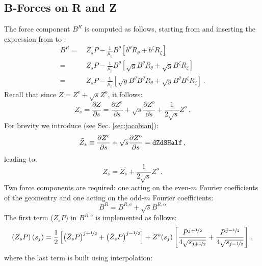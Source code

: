 \subsection{B-Forces on R and Z}
The force component $B^R$ is computed as follows, starting from 
and inserting the expression from  to :
\begin{align}
  B^R =&\, Z_s P - \frac{1}{\mu_0} B^\theta \left[          b^\theta          R_\theta +          b^\zeta          R_\zeta \right] \nonumber \\
      =&\, Z_s P - \frac{1}{\mu_0} B^\theta \left[ \sqrt{g} B^\theta          R_\theta + \sqrt{g} B^\zeta          R_\zeta \right] \nonumber \\
      =&\, Z_s P - \frac{1}{\mu_0}          \left[ \sqrt{g} B^\theta B^\theta R_\theta + \sqrt{g} B^\theta B^\zeta R_\zeta \right] \, .
\end{align}
Recall that since $Z = Z^\mathrm{e} + \sqrt{s} Z^\mathrm{o}$, it follows:
\begin{equation}
  Z_s = \frac{\partial Z}{\partial s} = \frac{\partial Z^\mathrm{e}}{\partial s} + \sqrt{s} \frac{\partial Z^\mathrm{o}}{\partial s} + \frac{1}{2 \sqrt{s}} Z^o \, .
\end{equation}
For brevity we introduce (see Sec. \ref{sec:jacobian}):
\begin{equation}
  \tilde{Z}_s \equiv \frac{\partial Z^\mathrm{e}}{\partial s} + \sqrt{s} \frac{\partial Z^\mathrm{o}}{\partial s} = \texttt{dZdSHalf} \, ,
\end{equation}
leading to:
\begin{equation}
  Z_s = \tilde{Z}_s + \frac{1}{2 \sqrt{s}} Z^o \, .
\end{equation}
Two force components are required: one acting on the even-$m$ Fourier coefficients of the geomentry
and one acting on the odd-$m$ Fourier coefficients:
\begin{equation}
  B^R = B^{R,\mathrm{e}} + \sqrt{s} B^{R,\mathrm{o}}
\end{equation}
The first term ($Z_s P$) in $B^{R,\mathrm{e}}$ is implemented as follows:
\begin{equation}
  \left( Z_s P \right) (s_j)
  =   \frac{1}{2} \left[ \left( \tilde{Z}_s P \right)^{j+\nicefrac{1}{2}} + \left( \tilde{Z}_s P \right)^{j-\nicefrac{1}{2}} \right]
    + Z^o(s_j) \left[ \frac{P^{j+\nicefrac{1}{2}}}{4 \sqrt{s_{j+\nicefrac{1}{2}}}}  + \frac{P^{j-\nicefrac{1}{2}}}{4 \sqrt{s_{j-\nicefrac{1}{2}}}}  \right] \, ,
\end{equation}
where the last term is built using interpolation:
